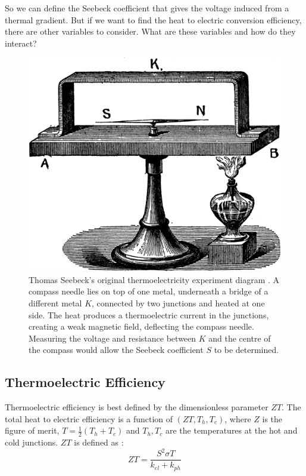 \documentclass[12pt]{article}
\begin{document}
So we can define the Seebeck coefficient that gives the voltage induced from a thermal gradient. But if we want to find the heat to electric conversion efficiency, there are other variables to consider. What are these variables and how do they interact? 

\begin{figure}
	\centering
	\includegraphics[width=\textwidth]{seebeck-experiment-black.png}
	\caption{Thomas Seebeck's original thermoelectricity experiment diagram \cite{seebeck-original}. A compass needle lies on top of one metal, underneath a bridge of a different metal $K$, connected by two junctions and heated at one side. The heat produces a thermoelectric current in the junctions, creating a weak magnetic field, deflecting the compass needle. Measuring the voltage and resistance between $K$ and the centre of the compass would allow the Seebeck coefficient $S$ to be determined.}
	\label{fig:seebeck-experiment}
\end{figure}

\pagebreak

\subsection{Thermoelectric Efficiency}
\label{sec:efficiency}
Thermoelectric efficiency is best defined by the dimensionless parameter $ZT$. The total heat to electric efficiency is a function of $(ZT, T_h, T_c)$, where $Z$ is the figure of merit, $T = \frac{1}{2}(T_h + T_c)$ and $T_h, T_c$ are the temperatures at the hot and cold junctions. $ZT$ is defined as \cite{modern-thermoelectrics}:
\begin{equation}
\label{eq:zt}
	ZT = \frac{S^2 \sigma T}{k_{el} + k_{ph}}
\end{equation}
\end{document}
